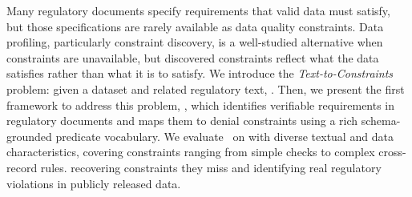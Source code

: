 Many regulatory documents specify requirements that valid data must satisfy, but those specifications are rarely available as data quality constraints. 
Data profiling, particularly constraint discovery, is a well-studied alternative when constraints are unavailable, but discovered constraints reflect what the data satisfies rather than what it is  to satisfy.
We introduce the \emph{Text-to-Constraints} problem: given a dataset and related regulatory text, . 
Then, we present the first framework to address this problem, \system, which identifies verifiable requirements in regulatory documents and maps them to denial constraints using a rich schema-grounded predicate vocabulary. 
We evaluate \system\ on  with diverse textual and data characteristics, covering constraints ranging from simple checks to complex cross-record rules.  recovering constraints they miss and identifying real regulatory violations in publicly released data.







